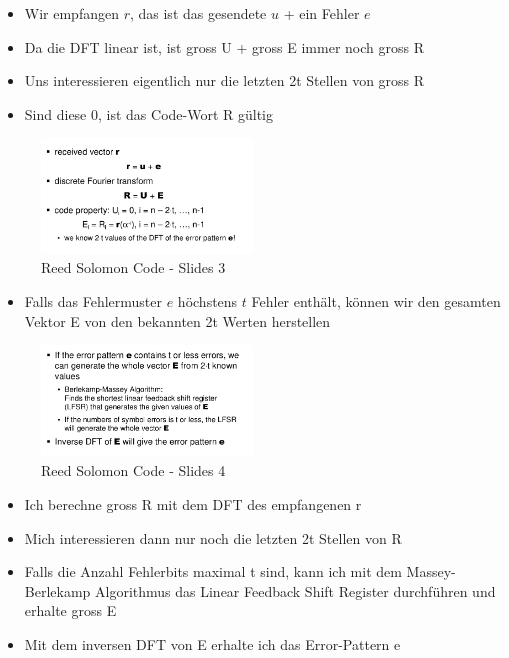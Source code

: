 \begin{itemize}
\tightlist
\item
  Wir empfangen $r$, das ist das gesendete $u$ + ein Fehler $e$
\item
  Da die DFT linear ist, ist gross U + gross E immer noch gross R
\item
  Uns interessieren eigentlich nur die letzten 2t Stellen von gross R
\item
  Sind diese 0, ist das Code-Wort R gültig
\end{itemize}

\begin{figure}[H]
\centering
\includegraphics[width=0.5\textwidth]{figures/reedSolomonDecoding.png}
\caption{Reed Solomon Code - Slides 3}
\end{figure}

\begin{itemize}
\tightlist
\item
  Falls das Fehlermuster $e$ höchstens $t$ Fehler enthält, können wir den
  gesamten Vektor E von den bekannten 2t Werten herstellen
\end{itemize}

\begin{figure}[H]
\centering
\includegraphics[width=0.5\textwidth]{figures/reedSolomonDecoding2.png}
\caption{Reed Solomon Code - Slides 4}
\end{figure}

\begin{itemize}
\tightlist
\item
  Ich berechne gross R mit dem DFT des empfangenen r
\item
  Mich interessieren dann nur noch die letzten 2t Stellen von R
\item
  Falls die Anzahl Fehlerbits maximal t sind, kann ich mit dem
  Massey-Berlekamp Algorithmus das Linear Feedback Shift Register
  durchführen und erhalte gross E
\item
  Mit dem inversen DFT von E erhalte ich das Error-Pattern e
\end{itemize}

